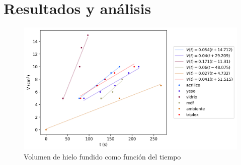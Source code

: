 \section{Resultados y análisis}

\begin{figure}[htbp]
    \centering
    \includegraphics[width=0.5\linewidth]{img/V_vs_t.png}
    \caption{Volumen de hielo fundido como función del tiempo}
    \label{fig:V_vs_t}
\end{figure}
